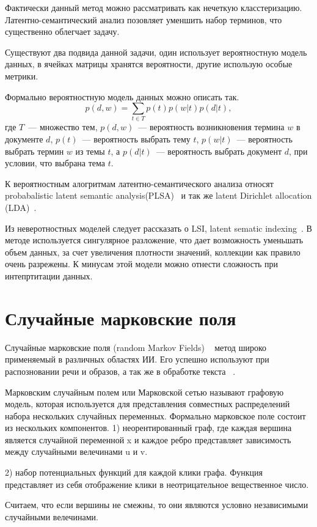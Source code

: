 \documentclass[annotation,times,page4]{itmo-student-thesis}
\begin{document}
Фактически данный метод можно рассматривать как нечеткую класстеризацию. Латентно-семантический анализ позовляет уменшить набор терминов, что существенно облегчает задачу.

Существуют два подвида данной задачи, один использует вероятностную модель данных, в ячейках матрицы хранятся вероятности, другие использую особые метрики.

Формально вероятностную модель данных можно описать так.
\[
    p(d, w) = \sum_{t \in T} p(t)p(w|t)p(d|t),
\]
где $T$~--- множество тем, $p(d, w)$~--- вероятность возникновения
термина $w$ в документе $d$, $p(t)$~--- вероятность выбрать тему $t$,
$p(w|t)$~--- вероятность выбрать термин $w$ из темы $t$, а
$p(d|t)$~--- вероятность выбрать документ $d$, при условии, что
выбрана тема $t$.

К вероятностным алогритмам латентно-семантического анализа относят  probabalistic latent semantic analysis(PLSA)~\cite{chemudugunta2007modeling} и так же latent Dirichlet allocation (LDA)~\cite{blei2003latent}.

Из неверотностных моделей следует рассказать о LSI, latent sematic indexing~\cite{deerwester1990indexing}. В методе используется сингулярное разложение, что дает возможность уменьшать объем данных, за счет увеличения плотности значений, коллекции как правило очень разрежены. К минусам этой модели можно отнести сложность при интепртитации данных. 

\section{Случайные марковские поля}
Случайные марковские поля (random Markov Fields) ~\cite{kindermann1980markov} метод широко применяемый в различных областях ИИ. Его успешно используют при распозновании речи и образов, а так же в обработке текста ~\cite{li2009markov, романенко2014применение}.

Марковским случайным полем или Марковской сетью называют графовую модель, которая используется для представления совместных распределений набора нескольких случайных переменных. Формально марковское поле состоит из нескольких компонентов.
1) неорентированный граф, где каждая вершина является случайной переменной x и каждое ребро представляет зависимость между случайными велечинами u и v.

2) набор потенциальных функций для каждой клики графа. Функция представляет из себя отображение клики в неотрицательное вещественное число.

Считаем, что если вершины не смежны, то они являются условно независимыми случайными велечинами.
\end{document}
